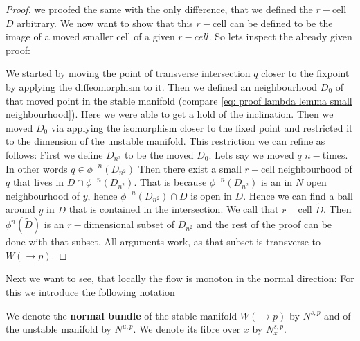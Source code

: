 \begin{proof}
 we proofed the same with the only difference, that we defined the $r-$cell $D$ arbitrary. We now want to show that this $r-$cell can be defined to be the image of a moved smaller cell of a given $r-cell$. So lets inspect the already given proof:
	
	We started by moving the point of transverse intersection $q$ closer to the fixpoint by applying the diffeomorphism to it. Then we defined an neighbourhood $D_0$ of that moved point in the stable manifold (compare \ref{eq: proof lambda lemma small neighbourhood}). Here we were able to get a hold of the inclination. Then we moved $D_0$ via applying the isomorphism closer to the fixed point and restricted it to the dimension of the unstable manifold. This restriction we can refine as follows: First we define $D_{n^2}$ to be the moved $D_0$. Lets say we moved $q$ $n-$times. In other words $q\in \phi^{-n}(D_{n^2})$ Then there exist a small $r-$cell neighbourhood of $q$ that lives in $D \cap \phi^{-n}(D_{n^2})$. That is because $ \phi^{-n}(D_{n^2})$ is an in $N$ open neighbourhood of $y$, hence $\phi^{-n}(D_{n^2}) \cap D$ is open in $D$. Hence we can find a ball around $y$ in $D$ that is contained in the intersection. We call that $r-$cell $\tilde{D}$. Then $\phi^n(\tilde{D})$ is an $r-$dimensional subset of $D_{n^2}$ and the rest of the proof can be done with that subset. All arguments work, as that subset is transverse to $W(\to p)$. 
\end{proof}
Next we want to see, that locally the flow is monoton in the normal direction:
For this we introduce the following notation
\begin{definition}
	We denote the \textbf{normal bundle} of the stable manifold $W(\to p)$ by $N^{s,p}$ and of the unstable manifold by $N^{u,p}$. We denote its fibre over $x$ by $N^{s,p}_x$. 
\end{definition}

